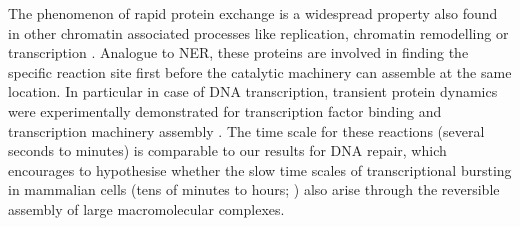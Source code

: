 The phenomenon of rapid protein exchange is a widespread property also found in other chromatin associated processes like replication, chromatin remodelling or transcription \cite{McNairn2005,Erdel2011,Sonneville2012,Stasevich2011}. Analogue to NER, these proteins are involved in finding the specific reaction site first before the catalytic machinery can assemble at the same location. In particular in case of DNA transcription, transient protein dynamics were experimentally demonstrated for transcription factor binding and transcription machinery assembly \cite{Hager2009}. The time scale for these reactions (several seconds to minutes) is comparable to our results for DNA repair, which encourages to hypothesise whether the  slow time scales of transcriptional bursting in mammalian cells (tens of minutes to hours; \cite{Harper2011,Suter2011}) also arise through the reversible assembly of large macromolecular complexes.   



